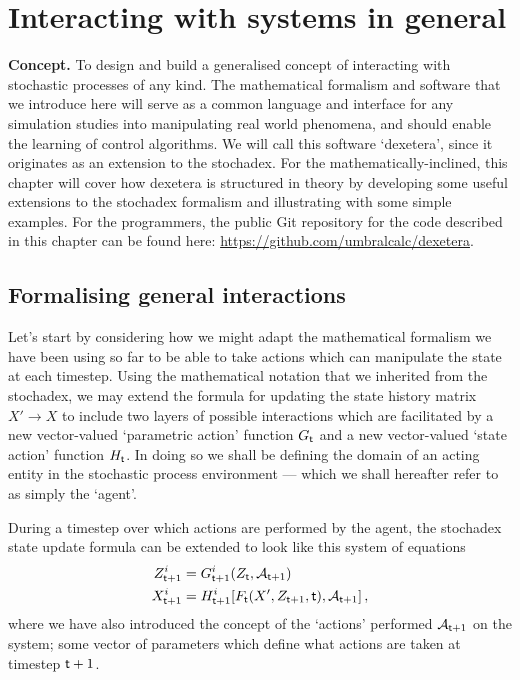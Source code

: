 \chapter{\sffamily Interacting with systems in general}

{\bfseries\sffamily Concept.} To design and build a generalised concept of interacting with stochastic processes of any kind. The mathematical formalism and software that we introduce here will serve as a common language and interface for any simulation studies into manipulating real world phenomena, and should enable the learning of control algorithms. We will call this software `dexetera', since it originates as an extension to the stochadex. For the mathematically-inclined, this chapter will cover how dexetera is structured in theory by developing some useful extensions to the stochadex formalism and illustrating with some simple examples. For the programmers, the public Git repository for the code described in this chapter can be found here: \href{https://github.com/umbralcalc/dexetera}{https://github.com/umbralcalc/dexetera}.

\section{\sffamily Formalising general interactions}

Let's start by considering how we might adapt the mathematical formalism we have been using so far to be able to take actions which can manipulate the state at each timestep. Using the mathematical notation that we inherited from the stochadex, we may extend the formula for updating the state history matrix $X'\rightarrow X$ to include two layers of possible interactions which are facilitated by a new vector-valued `parametric action' function $G_{{\sf t}}$ and a new vector-valued `state action' function $H_{{\sf t}}$. In doing so we shall be defining the domain of an acting entity in the stochastic process environment --- which we shall hereafter refer to as simply the `agent'.

During a timestep over which actions are performed by the agent, the stochadex state update formula can be extended to look like this system of equations
\begin{align}
Z_{{\sf t}+1}^i &= G_{{\sf t}+1}^i(Z_{{\sf t}}, {\cal A}_{{\sf t}+1}) \label{eq:generalised-param-actions} \\
X_{{\sf t}+1}^i &= H^i_{{\sf t}+1}[F_{\sf t}(X', Z_{{\sf t}+1}, {\sf t}), {\cal A}_{{\sf t}+1}] \label{eq:generalised-state-actions} \,,
\end{align}
where we have also introduced the concept of the `actions' performed ${\cal A}_{{\sf t}+1}$ on the system; some vector of parameters which define what actions are taken at timestep ${\sf t}+1$.

